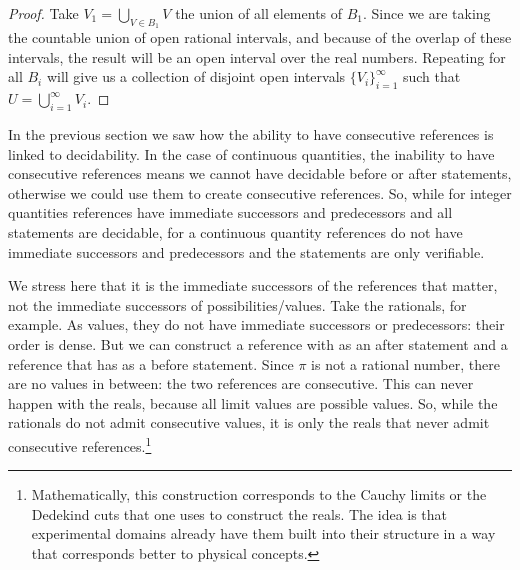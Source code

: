 \documentclass[11pt,letterpaper,fleqn]{memoir} %
\begin{document}
\begin{mathSection}
\begin{proof}
	Take $V_1 = \bigcup\limits_{V \in B_1} V$ the union of all elements of $B_1$. Since we are taking the countable union of open rational intervals, and because of the overlap of these intervals, the result will be an open interval over the real numbers. Repeating for all $B_i$ will give us a collection of disjoint open intervals $\{ V_i \}_{i=1}^{\infty}$ such that $U = \bigcup\limits_{i=1}^{\infty} V_i$.
\end{proof}
\end{mathSection}

In the previous section we saw how the ability to have consecutive references is linked to decidability. In the case of continuous quantities, the inability to have consecutive references means we cannot have decidable before or after statements, otherwise we could use them to create consecutive references. So, while for integer quantities references have immediate successors and predecessors and all statements are decidable, for a continuous quantity references do not have immediate successors and predecessors and the statements are only verifiable.

We stress here that it is the immediate successors of the references that matter, not the immediate successors of possibilities/values. Take the rationals, for example. As values, they do not have immediate successors or predecessors: their order is dense. But we can construct a reference with  as an after statement and a reference that has  as a before statement. Since $\pi$ is not a rational number, there are no values in between: the two references are consecutive. This can never happen with the reals, because all limit values are possible values. So, while the rationals do not admit consecutive values, it is only the reals that never admit consecutive references.\footnote{Mathematically, this construction corresponds to the Cauchy limits or the Dedekind cuts that one uses to construct the reals. The idea is that experimental domains already have them built into their structure in a way that corresponds better to physical concepts.}
\end{document}
